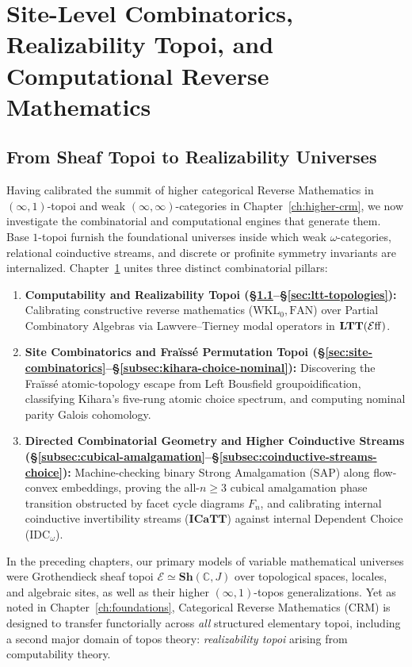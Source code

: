 \chapter{Site-Level Combinatorics, Realizability Topoi, and Computational Reverse Mathematics}

\label{ch:realizability-sites}

\section{From Sheaf Topoi to Realizability Universes}\label{sec:kleene-eff}

Having calibrated the summit of higher categorical Reverse Mathematics in $(\infty, 1)$-topoi and weak $(\infty, \infty)$-categories in Chapter~\ref{ch:higher-crm}, we now investigate the combinatorial and computational engines that generate them. Base $1$-topoi furnish the foundational universes inside which weak $\omega$-categories, relational coinductive streams, and discrete or profinite symmetry invariants are internalized. Chapter~\ref{ch:realizability-sites} unites three distinct combinatorial pillars:
\begin{enumerate}
  \item \textbf{Computability and Realizability Topoi (\S\ref{sec:kleene-eff}--\S\ref{sec:ltt-topologies}):} Calibrating constructive reverse mathematics ($\mathrm{WKL}_0, \mathrm{FAN}$) over Partial Combinatory Algebras via Lawvere--Tierney modal operators in $\mathbf{LTT}(\mathcal{E}\mathrm{ff})$.
  \item \textbf{Site Combinatorics and Fra\"iss\'e Permutation Topoi (\S\ref{sec:site-combinatorics}--\S\ref{subsec:kihara-choice-nominal}):} Discovering the Fra\"iss\'e atomic-topology escape from Left Bousfield groupoidification, classifying Kihara's five-rung atomic choice spectrum, and computing nominal parity Galois cohomology.
  \item \textbf{Directed Combinatorial Geometry and Higher Coinductive Streams (\S\ref{subsec:cubical-amalgamation}--\S\ref{subsec:coinductive-streams-choice}):} Machine-checking binary Strong Amalgamation ($\mathrm{SAP}$) along flow-convex embeddings, proving the all-$n \ge 3$ cubical amalgamation phase transition obstructed by facet cycle diagrams $F_n$, and calibrating internal coinductive invertibility streams ($\mathbf{ICaTT}$) against internal Dependent Choice ($\mathrm{IDC}_\omega$).
\end{enumerate}

In the preceding chapters, our primary models of variable mathematical universes were Grothendieck sheaf topoi $\mathcal{E} \simeq \mathbf{Sh}(\mathbb{C}, J)$ over topological spaces, locales, and algebraic sites, as well as their higher $(\infty, 1)$-topos generalizations. Yet as noted in Chapter~\ref{ch:foundations}, Categorical Reverse Mathematics ($\mathrm{CRM}$) is designed to transfer functorially across \emph{all} structured elementary topoi, including a second major domain of topos theory: \emph{realizability topoi} arising from computability theory.

